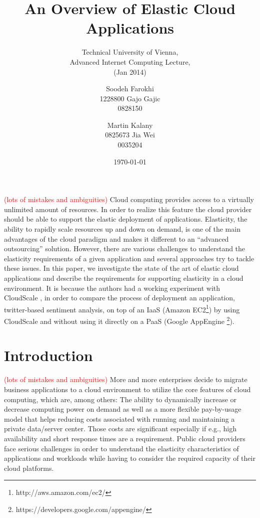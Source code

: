 \documentclass{sig-alternate}
\newcommand\todo[1]{\textcolor{red}{(#1)}}
\begin{document}
\title{An Overview of Elastic Cloud Applications}
\subtitle{Technical University of Vienna,\\Advanced Internet Computing Lecture,\\
(Jan 2014)}


\author{
\alignauthor
Soodeh Farokhi\\ %
       1228800
\alignauthor
Gajo Gajic\\
       0828150
\and
\alignauthor
Martin Kalany\\
       0825673
\alignauthor
Jia Wei\\
       0035204
}
       
\date{\today}

\maketitle
\begin{abstract}
\end{abstract}
\todo{lots of mistakes and ambiguities}
Cloud computing provides access to a virtually unlimited amount of resources.  In order to realize this feature the cloud provider should be able to support the elastic deployment of applications. Elasticity, the ability to rapidly scale resources up and down on demand, is one of the main advantages of the cloud paradigm and makes it different to an ``advanced outsourcing'' solution.
However, there are various challenges to understand the elasticity requirements of a given application and  several approaches try to tackle these issues. In this paper, we investigate the state of the art of elastic cloud applications and describe the requirements for supporting elasticity in a cloud environment. 
It is because the authors had a working experiment with CloudScale \cite{leitner2012cloudscale}, \cite{Leitner2013} in order to compare the process of deployment an application, twitter-based sentiment analysis, on top of an IaaS (Amazon EC2\footnote{http://aws.amazon.com/ec2/}) by using CloudScale and without using it directly on a PaaS (Google AppEngine \footnote{https://developers.google.com/appengine/}).

\section{Introduction}
\todo{lots of mistakes and ambiguities}
More and more enterprises decide to migrate business applications to a cloud environment to utilize the core features of cloud computing, which are, among others: The ability to dynamically increase or decrease computing power on demand as well as a more flexible pay-by-usage model that helps reducing costs associated with running and maintaining a private data/server center. Those costs are significant especially if e.g., high availability and short response times are a requirement. Public cloud providers face serious challenges in order to understand the elasticity characteristics of applications and workloads while having to consider the required capacity of their cloud platforms. 
\end{document}
